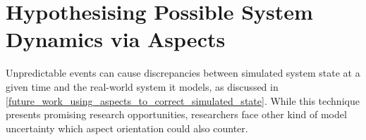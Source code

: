 



\section{Hypothesising Possible System Dynamics via Aspects}
\label{future_work_hypothesising_system_states}


Unpredictable events can cause discrepancies between simulated system state at a
given time and the real-world system it models, as discussed in
\cref{future_work_using_aspects_to_correct_simulated_state}. While this
technique presents promising research opportunities, researchers face other kind
of model uncertainty which aspect orientation could also counter.

